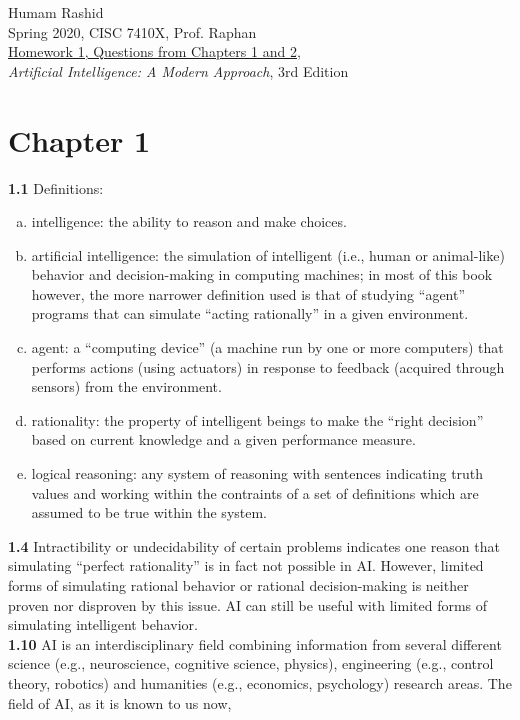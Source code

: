 \documentclass{scrartcl}
\begin{document}
\begin{flushleft}
Humam Rashid\\
Spring 2020, CISC 7410X, Prof. Raphan\\
\underline{Homework 1, Questions from Chapters 1 and 2,}\\
\textit{Artificial Intelligence: A Modern Approach}, 3rd Edition
\end{flushleft}

\section*{Chapter 1}
\textbf{1.1} Definitions:
\begin{enumerate}[(a)]
    \item intelligence: the ability to reason and make choices.
    \item artificial intelligence: the simulation of intelligent (i.e., human or animal-like)
        behavior and decision-making in computing machines; in most of this book however, the more
        narrower definition used is that of studying ``agent'' programs that can simulate
        ``acting rationally'' in a given environment.
    \item agent: a ``computing device'' (a machine run by one or more computers) that performs
        actions (using actuators) in response to feedback (acquired through sensors) from the
        environment.
    \item rationality: the property of intelligent beings to make the ``right decision'' based on
        current knowledge and a given performance measure.
    \item logical reasoning: any system of reasoning with sentences indicating truth values and
        working within the contraints of a set of definitions which are assumed to be true within
        the system.
\end{enumerate}
\textbf{1.4} Intractibility or undecidability of certain problems indicates one reason that
simulating ``perfect rationality'' is in fact not possible in AI. However, limited forms of
simulating rational behavior or rational decision-making is neither proven nor disproven by this
issue. AI can still be useful with limited forms of simulating intelligent behavior.
\bigskip
\\
\textbf{1.10} AI is an interdisciplinary field combining information from several different science
(e.g., neuroscience, cognitive science, physics), engineering (e.g., control theory, robotics) and
humanities (e.g., economics, psychology) research areas. The field of AI, as it is known to us now,
\end{document}

